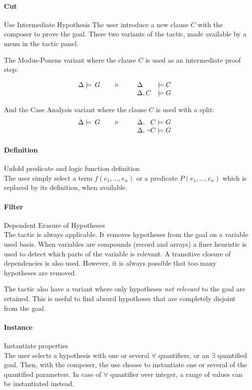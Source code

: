 \paragraph{Cut} Use Intermediate Hypothesis
The user introduce a new clause $C$ with the composer to prove the goal. There two variants of the tactic, made available by a menu in the tactic panel.

The \textsf{Modus-Ponens} variant where the clause $C$ is used as an intermediate proof step:

$$\TACTIC{\Delta\models\,G}{%
\begin{array}[t]{ll}
\Delta &\models C \\
\Delta,C &\models G
\end{array}} $$

And the \textsf{Case Analysis} variant where the clause $C$ is used with a split:
$$\TACTIC{\Delta\models\,G}{%
\begin{array}[t]{ll}
\Delta,\phantom{\neg}C \models G \\
\Delta,\neg C \models G
\end{array}} $$

\paragraph{Definition} Unfold predicate and logic function definition\\
The user simply select a term $f(e_1,\ldots,e_n)$ or a predicate $P(e_1,\ldots,e_n)$ which is replaced by its definition, when available.

\paragraph{Filter} Dependent Erasure of Hypotheses \\
The tactic is always applicable. It removes hypotheses from the goal on a
variable used basis. When variables are compounds (record and arrays) a finer
heuristic is used to detect which parts of the variable is relevant. A
transitive closure of dependencies is also used. However, it is always
possible that too many hypotheses are removed.

The tactic also have a variant where only hypotheses \emph{not relevant} to the
goal are retained. This is useful to find absurd hypotheses that are completely
disjoint from the goal.

\paragraph{Instance} Instantiate properties\\
The user selects a hypothesis with one or several $\forall$ quantifiers, or an $\exists$ quantified goal. Then, with the composer, the use choose to instantiate one or several of the quantified parameters. In case of $\forall$ quantifier over integer, a range of values can be instantiated instead.

